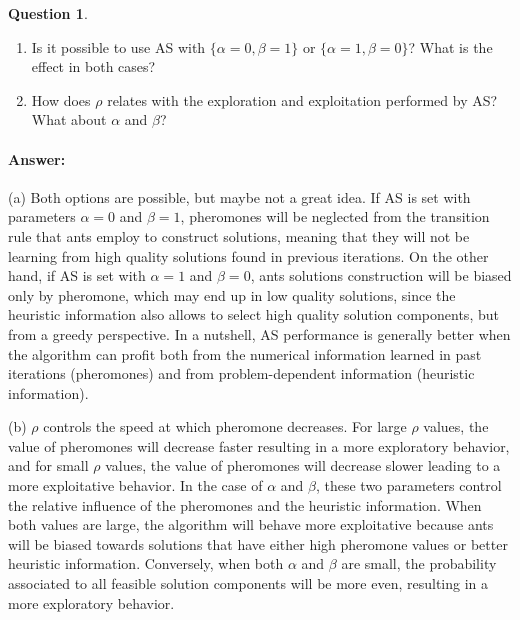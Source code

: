 \documentclass[11pt,a4paper]{article}
\theoremstyle{definition}%
\newtheorem{Q}{Question}[] %
\newcommand{\reponse}[1]{%
\ifthenelse {\boolean{corrige}} {\paragraph{Answer:} \color{darkblue}   #1\color{black}} {}
}
\begin{document}
\begin{Q}
\begin{enumerate}
 \item Is it possible to use AS with $\{\alpha=0, \beta=1\}$ or  $\{\alpha=1, \beta=0\}$? 
     What is the effect in both cases?
 \item How does $\rho$ relates with the exploration and exploitation performed by AS? What 
     about $\alpha$ and $\beta$?
\end{enumerate}

\reponse{
    (a) Both options are possible, but maybe not a great idea. If AS is set with parameters 
    $\alpha = 0$ and $\beta = 1$, pheromones will be neglected from the transition rule that 
    ants employ to construct solutions, meaning that they will not be learning from high 
    quality solutions found in previous iterations. On the other hand, if AS is set with 
    $\alpha = 1$ and $\beta = 0$, ants solutions construction will be biased only by pheromone,
    which may end up in low quality solutions, since the heuristic information also allows 
    to select high quality solution components, but from a greedy perspective. In a nutshell, 
    AS performance is generally better when the algorithm can profit both from the numerical 
    information learned in past iterations (pheromones) and from problem-dependent information 
    (heuristic information).


    (b) $\rho$ controls the speed at which pheromone decreases. For large $\rho$ values, the 
    value of pheromones will decrease faster resulting in a more exploratory behavior, and for 
    small $\rho$ values, the value of pheromones will decrease slower leading to a more 
    exploitative behavior. In the case of $\alpha$ and $\beta$, these two parameters control 
    the relative influence of the pheromones and the heuristic information. When both values 
    are large, the algorithm will behave more exploitative because ants will be biased towards 
    solutions that have either high pheromone values or better heuristic information. 
    Conversely, when both $\alpha$ and $\beta$ are small, the probability associated to all 
    feasible solution components will be more even, resulting in a more exploratory behavior.
}

\end{Q}
\end{document}
